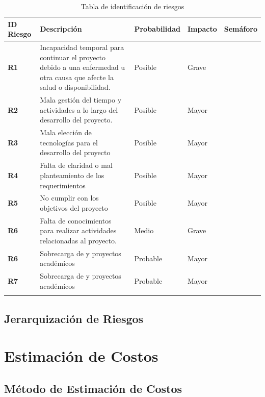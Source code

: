 \begin{longtable}{|m{1.5cm}|m{5.3cm}|m{3cm}|m{2cm}|m{2cm}|}
	\rowcolor{black!75} \color{white} \textbf{ID Riesgo} & \color{white} \textbf{Descripción} & \color{white} \textbf{Probabilidad} & \color{white} \textbf{Impacto} & \color{white} \textbf{Semáforo} \\ \hline
	\textbf{R1} & Incapacidad temporal para continuar el proyecto debido a una enfermedad u otra causa que afecte la salud o disponibilidad. & Posible & Grave & \cellcolor{red!80} \\ \hline
	\textbf{R2} & Mala gestión del tiempo y actividades a  lo largo del desarrollo del proyecto. & Posible & Mayor & \cellcolor{orange!80} \\ \hline
	\textbf{R3} & Mala elección de tecnologías para el desarrollo del proyecto & Posible & Mayor & \cellcolor{orange!80} \\ \hline
	\textbf{R4} & Falta de claridad o mal planteamiento de los requerimientos & Posible & Mayor & \cellcolor{orange!80} \\ \hline
	\textbf{R5} & No cumplir con los objetivos del proyecto & Posible & Mayor & \cellcolor{red!80} \\ \hline
	\textbf{R6} & Falta de conocimientos para realizar actividades relacionadas al proyecto. & Medio & Grave &  \cellcolor{yellow!60} \\ \hline
	\textbf{R6} & Sobrecarga de y proyectos académicos & Probable & Mayor &  \cellcolor{red!80}  \\ \hline
	\textbf{R7} & Sobrecarga de y proyectos académicos & Probable & Mayor &  \cellcolor{red!80}  \\ \hline
	\rowcolor{white} \caption{Tabla de identificación de riesgos} \label{tabla:riesgos} \\
	
\end{longtable}

\subsection{Jerarquización de Riesgos}

\section{Estimación de Costos}
\subsection{Método de Estimación de Costos}
